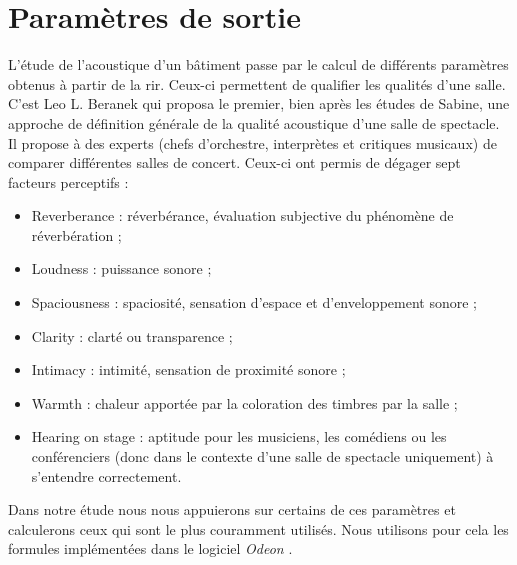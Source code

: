 \section{Paramètres de sortie} \label{sect_data}
L'étude de l'acoustique d'un bâtiment passe par le calcul de différents paramètres obtenus à partir de la \gls{rir}. Ceux-ci permettent de qualifier les qualités d'une salle. C'est Leo L. Beranek qui proposa le premier, bien après les études de Sabine, une approche de définition générale de la qualité acoustique d'une salle de spectacle. Il propose à des experts (chefs d’orchestre, interprètes et critiques musicaux) de comparer différentes salles de concert. Ceux-ci ont permis de dégager sept facteurs perceptifs :
\begin{itemize}
	\item Reverberance : réverbérance, évaluation subjective du phénomène de réverbération ;
	\item Loudness : puissance sonore ;
	\item Spaciousness : spaciosité, sensation d'espace et d'enveloppement sonore ;
	\item Clarity : clarté ou transparence ;
	\item Intimacy : intimité, sensation de proximité sonore ;
	\item Warmth : chaleur apportée par la coloration des timbres par la salle ;
	\item Hearing on stage : aptitude pour les musiciens, les comédiens ou les conférenciers (donc dans le contexte d'une salle de spectacle uniquement) à s'entendre correctement. 
\end{itemize}

Dans notre étude nous nous appuierons sur certains de ces paramètres et calculerons ceux qui sont le plus couramment utilisés. Nous utilisons pour cela les formules implémentées dans le logiciel \textit{Odeon} \cite[p.87-92]{odeonManuel}.%

